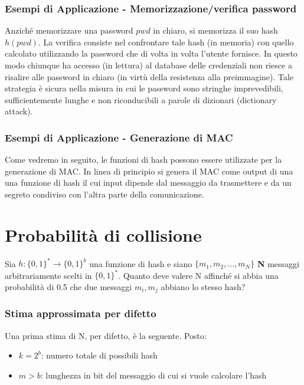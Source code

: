 \subsubsection{Esempi di Applicazione - Memorizzazione/verifica password}
Anziché memorizzare una password $pwd$ in chiaro, si memorizza il suo hash $h(pwd)$. La verifica consiste nel confrontare tale hash (in memoria) con quello calcolato utilizzando la password che di volta in volta l'utente fornisce. In questo modo chiunque ha accesso (in lettura) al database delle credenziali non riesce a risalire alle password in chiaro (in virtù della resistenza alla preimmagine). Tale strategia è sicura nella misura in cui le password sono stringhe imprevedibili, sufficientemente lunghe e non riconducibili a parole di dizionari (dictionary attack).

\subsubsection{Esempi di Applicazione - Generazione di MAC}
Come vedremo in seguito, le funzioni di hash possono essere utilizzate per la generazione di MAC. In linea di principio si genera il MAC come output di una una funzione di hash il cui input dipende dal messaggio da trasmettere e da un segreto condiviso con l'altra parte della comunicazione.

\section{Probabilità di collisione}
Sia $h:\{0, 1\}^{*} \rightarrow \{0, 1\}^{b}$ una funzione di hash e siano $\{m_{1}, m_{2}, ..., m_{N}\}$ \textbf{N} messaggi arbitrariamente scelti in $\{0, 1\}^{*}$. Quanto deve valere N affinché si abbia una probabilità di 0.5 che due messaggi $m_{i}, m_{j}$ abbiano lo stesso hash?

\subsubsection{Stima approssimata per difetto} \label{par:stima_difetto}

Una prima stima di N, per difetto, è la seguente. Posto:
\begin{itemize}
	\item $k = 2^{b}$: numero totale di possibili hash
	\item $m>b$: lunghezza in bit del messaggio di cui si vuole calcolare l'hash
\end{itemize}
 
